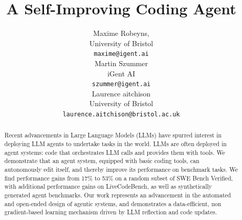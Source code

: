 \documentclass{article}
\title{A Self-Improving Coding Agent}
\author{%
    Maxime Robeyns, \\
  University of Bristol \\
  \texttt{maxime@igent.ai} \\
  \And
  Martin Szummer \\
  iGent AI \\
  \texttt{szummer@igent.ai} \\
  \AND
  Laurence aitchison \\
  University of Bristol \\
  \texttt{laurence.aitchison@bristol.ac.uk} \\
}
\begin{document}
\maketitle


\begin{abstract}
Recent advancements in Large Language Models (LLMs) have spurred interest in
deploying LLM agents to undertake tasks in the world. LLMs are often deployed in
agent systems: code that orchestrates LLM calls and provides them with tools. We
demonstrate that an agent system, equipped with basic coding tools, can
autonomously edit itself, and thereby improve its performance on benchmark
tasks. We find performance gains from 17\% to 53\% on a random subset of SWE
Bench Verified, with additional performance gains on LiveCodeBench, as well as
synthetically generated agent benchmarks. Our work represents an advancement in
the automated and open-ended design of agentic systems, and demonstrates a
data-efficient, non gradient-based learning mechanism driven by LLM reflection
and code updates.
\end{abstract}









{
\small




}



\appendix



\end{document}
